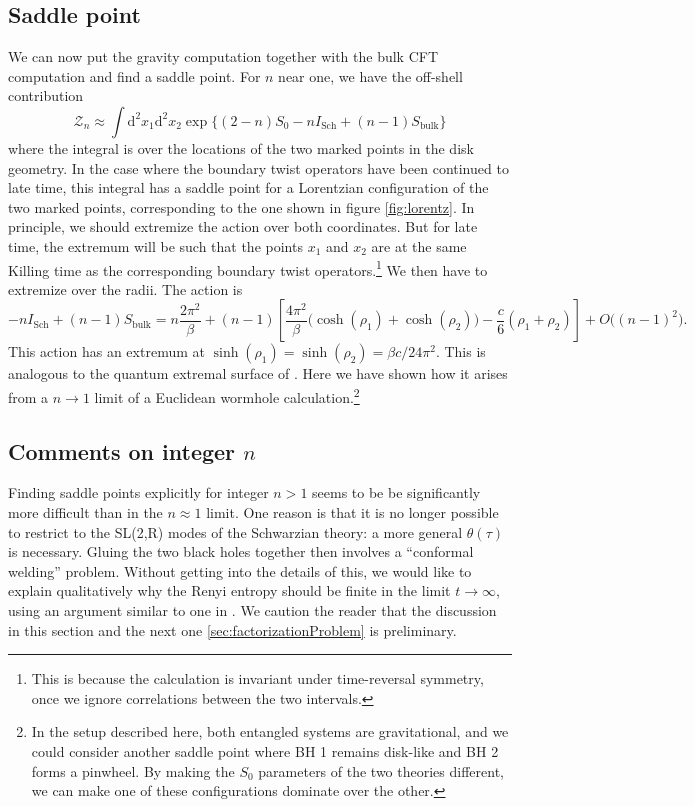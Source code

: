 \documentclass[11pt]{article}
\newcommand{\be}{\begin{equation}}
\newcommand{\ee}{\end{equation}}
\numberwithin{equation}{section}
\begin{document}
\subsection{Saddle point}
We can now put the gravity computation together with the bulk CFT computation and find a saddle point. For $n$ near one, we have the off-shell contribution 
\be
\mathcal{Z}_n \approx \int \mathrm{d}^2x_1\mathrm{d}^2x_2 \exp\Big\{ (2-n)S_0 - n I_{\text{Sch}} + (n-1)S_{\text{bulk}}\Big\}
\ee
where the integral is over the locations of the two marked points in the disk geometry. In the case where the boundary twist operators have been continued to late time, this integral has a saddle point for a Lorentzian configuration of the two marked points, corresponding to the one shown in figure \ref{fig:lorentz}. In principle, we should extremize the action over both coordinates. But for late time, the extremum will be such that the points $x_1$ and $x_2$ are at the same Killing time as the corresponding boundary twist operators.\footnote{This is because the calculation is invariant under time-reversal symmetry, once we ignore correlations between the two intervals.} We then have to extremize over the radii. The action is
\be
-nI_{\text{Sch}} + (n-1)S_{\text{bulk}} = n\frac{2\pi^2}{\beta} + (n-1)\left[\frac{4\pi^2}{\beta}\big(\cosh(\rho_1) + \cosh(\rho_2)\big) - \frac{c}{6}(\rho_1+\rho_2)\right] + O\big((n-1)^2\big).
\ee
This action has an extremum at $\sinh(\rho_1) = \sinh(\rho_2) =  \beta c/24\pi^2$. This is analogous to the quantum extremal surface of \cite{Penington:2019npb,Almheiri:2019psf,Almheiri:2019hni,Almheiri:2019yqk}. Here we have shown how it arises from a $n\to 1$ limit of a Euclidean wormhole calculation.\footnote{In the setup described here, both entangled systems are gravitational, and we could consider another saddle point where BH 1 remains disk-like and BH 2 forms a pinwheel. By making the $S_0$ parameters of the two theories different, we can make one of these configurations dominate over the other.}


\subsection{Comments on integer \texorpdfstring{$n$}{n}}\label{sec:commentsoninteger n}
Finding saddle points explicitly for integer $n > 1$ seems to be be significantly more difficult than in the $n\approx 1$ limit. One reason is that it is no longer possible to restrict to the SL(2,R) modes of the Schwarzian theory: a more general $\theta(\tau)$ is necessary. Gluing the two black holes together then involves a ``conformal welding'' problem. Without getting into the details of this, we would like to explain qualitatively why the Renyi entropy should be finite in the limit $t\rightarrow \infty$, using an argument similar to one in \cite{Saad:2018bqo}. We caution the reader that the discussion in this section and the next one \ref{sec:factorizationProblem} is preliminary.
\end{document}
